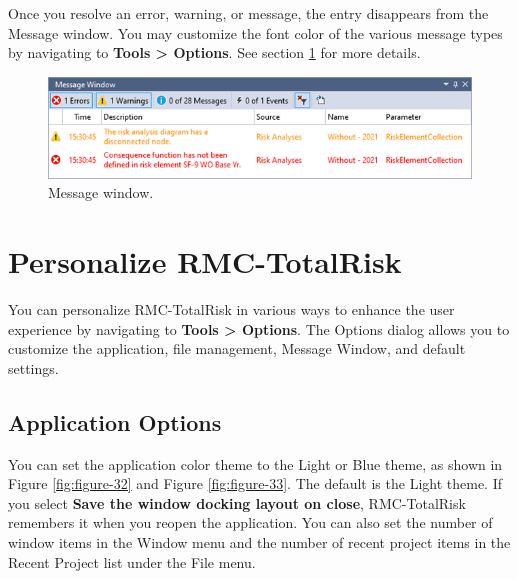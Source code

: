 \documentclass[
]{book}
\begin{document}
Once you resolve an error, warning, or message, the entry disappears from the Message window. You may customize the font color of the various message types by navigating to \textbf{Tools \textgreater{} Options}. See section \ref{options} for more details.

\begin{figure}

{\centering \includegraphics{images/figure31} 

}

\caption{Message window.}\label{fig:figure-31}
\end{figure}

\hypertarget{options}{%
\section{Personalize RMC-TotalRisk}\label{options}}

You can personalize RMC-TotalRisk in various ways to enhance the user experience by navigating to \textbf{Tools \textgreater{} Options}. The Options dialog allows you to customize the application, file management, Message Window, and default settings.

\hypertarget{application-options}{%
\subsection{Application Options}\label{application-options}}

You can set the application color theme to the Light or Blue theme, as shown in Figure \ref{fig:figure-32} and Figure \ref{fig:figure-33}. The default is the Light theme. If you select \textbf{Save the window docking layout on close}, RMC-TotalRisk remembers it when you reopen the application. You can also set the number of window items in the Window menu and the number of recent project items in the Recent Project list under the File menu.
\end{document}
